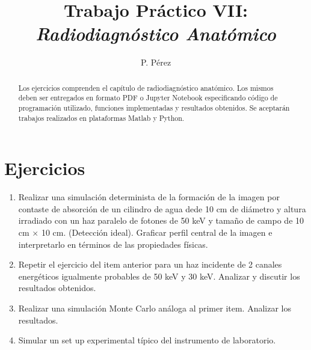 \documentclass[a4paper,10pt]{article}
\title{{\bf Trabajo Práctico VII:}\\ \emph{Radiodiagnóstico Anatómico}}
\author{P. Pérez}
\begin{document}
\maketitle

\begin{abstract}
Los ejercicios comprenden el capítulo de radiodiagnóstico anatómico. Los mismos deben ser entregados en formato PDF o Jupyter Notebook especificando código de programación utilizado, funciones implementadas y resultados obtenidos. Se aceptarán trabajos realizados en plataformas Matlab y Python.
\end{abstract}

\section*{Ejercicios}

\begin{enumerate}
 \item Realizar una simulación determinista de la formación de la imagen por contaste de absorción de un cilindro de agua dede 10 cm de diámetro y altura irradiado con un haz paralelo de fotones de 50 keV y tamaño de campo de 10 cm $\times$ 10 cm. (Detección ideal). Graficar perfil central de la imagen e interpretarlo en términos de las propiedades físicas.
 \item Repetir el ejercicio del item anterior para un haz incidente de 2 canales energéticos igualmente probables de 50 keV y 30 keV. Analizar y discutir los resultados obtenidos.
 \item Realizar una simulación Monte Carlo análoga al primer item. Analizar los resultados.
 \item Simular un set up experimental típico del instrumento de laboratorio.
\end{enumerate}
\end{document}
